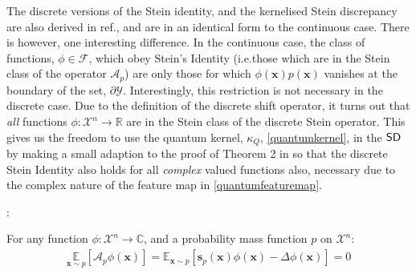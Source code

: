 The discrete versions of the Stein identity, and the kernelised Stein discrepancy are also derived in ref., and are in an identical form to the continuous case. There is however, one interesting difference. In the continuous case, the class of functions, $\phi \in \mathcal{F}$, which obey Stein's Identity (i.e.\@ those which are in the Stein class of the operator $\mathcal{A}_p$) are only those for which $\phi(\mathbf{x})p(\mathbf{x})$ vanishes at the boundary of the set, $\partial \mathcal{Y}$. Interestingly, this restriction is not necessary in the discrete case. Due to the definition of the discrete shift operator, it turns out that \textit{all} functions $\phi: \mathcal{X}^n \rightarrow \mathbb{R}$ are in the Stein class of the discrete Stein operator. This gives us the freedom to use the quantum kernel, $\kappa_Q$, \eqref{quantumkernel}, in the $\operatorname{\textsf{SD}}$ by making a small adaption to the proof of Theorem 2 in  so that the discrete Stein Identity also holds for all \textit{complex} valued functions also, necessary due to the complex nature of the feature map in \eqref{quantumfeaturemap}.
\begin{theorem}\label{thm:complexdiscretesteinidentity}:

For any function $\phi: \mathcal{X}^n\rightarrow \mathbb{C}$, and a probability mass function $p$ on $\mathcal{X}^n$:
\begin{align}
    \underset{\mathbf{x}\sim p}{\mathbb{E}}[\mathcal{A}_p \phi(\mathbf{x})]= \mathbb{E}_{\mathbf{x} \sim p}\left[\mathbf{s}_p(\mathbf{x})\phi(\mathbf{x}) - \Delta \phi(\mathbf{x})\right] = 0 
    \label{complexdiscretesteinidentity_supp}
\end{align}
\end{theorem}

